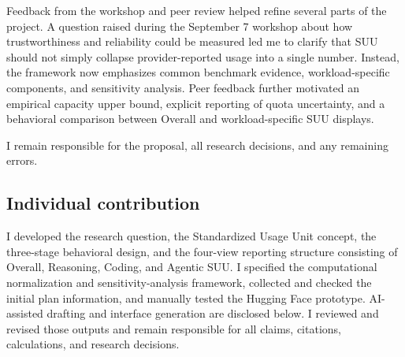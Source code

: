 \documentclass[sigconf,nonacm]{acmart}
\begin{document}
\vspace{0.5em}

Feedback from the workshop and peer review helped refine several parts of the
project. A question raised during the September 7 workshop about how
trustworthiness and reliability could be measured led me to clarify that SUU
should not simply collapse provider-reported usage into a single number.
Instead, the framework now emphasizes common benchmark evidence,
workload-specific components, and sensitivity analysis.
Peer feedback further motivated an empirical capacity upper bound, explicit
reporting of quota uncertainty, and a behavioral comparison between Overall and
workload-specific SUU displays.

\vspace{0.5em}

I remain responsible for the proposal, all research decisions,
and any remaining errors.


\subsection*{Individual contribution}

I developed the research question,
the Standardized Usage Unit concept,
the three-stage behavioral design,
and the four-view reporting structure consisting of
Overall, Reasoning, Coding, and Agentic SUU. I specified the computational normalization and sensitivity-analysis framework,
collected and checked the initial plan information,
and manually tested the Hugging Face prototype. AI-assisted drafting and interface generation are disclosed below. I reviewed and revised those outputs and remain responsible for all claims, citations, calculations, and research decisions.


\end{document}
